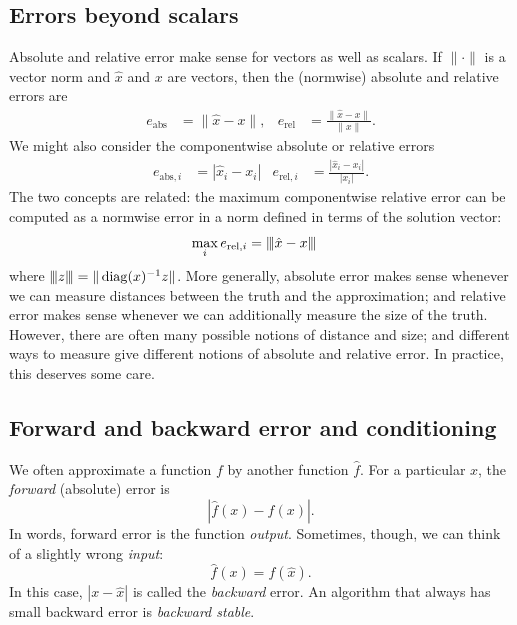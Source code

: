 \documentclass[12pt, leqno]{article}
\begin{document}
\subsection*{Errors beyond scalars}

Absolute and relative error make sense for vectors as well as scalars.
If $\| \cdot \|$ is a vector
norm and $\hat{x}$ and $x$ are vectors, then the (normwise) absolute
and relative errors are
\begin{align*}
  e_{\mathrm{abs}} &= \|\hat{x}-x\|, &
  e_{\mathrm{rel}} &= \frac{\|\hat{x}-x\|}{\|x\|}.
\end{align*}
We might also consider the componentwise absolute or relative errors
\begin{align*}
  e_{\mathrm{abs},i} &= |\hat{x}_i-x_i| &
  e_{\mathrm{rel},i} &= \frac{|\hat{x}_i-x_i|}{|x_i|}.
\end{align*}
The two concepts are related: the maximum componentwise relative error
can be computed as a normwise error in a norm defined in terms of the
solution vector:
\begin{align*}
  \max_i e_{\mathrm{rel},i} &= {\left\vert\kern-0.25ex\left\vert\kern-0.25ex\left\vert \hat{x}-x \right\vert\kern-0.25ex\right\vert\kern-0.25ex\right\vert}
\end{align*}
where ${\left\vert\kern-0.25ex\left\vert\kern-0.25ex\left\vert z \right\vert\kern-0.25ex\right\vert\kern-0.25ex\right\vert} = \|\operatorname{diag}(x)^{-1} z\|$.
More generally, absolute error makes sense whenever we can measure
distances between the truth and the approximation; and relative error
makes sense whenever we can additionally measure the size of the
truth.  However, there are often many possible notions of distance
and size; and different ways to measure give different notions of
absolute and relative error.  In practice, this deserves some care.

\subsection*{Forward and backward error and conditioning}

We often approximate a function $f$ by another function $\hat{f}$.
For a particular $x$, the {\em forward} (absolute) error is
\[
  |\hat{f}(x)-f(x)|.
\]
In words, forward error is the function {\em output}.  Sometimes,
though, we can think of a slightly wrong {\em input}:
\[
  \hat{f}(x) = f(\hat{x}).
\]
In this case, $|x-\hat{x}|$ is called the {\em backward} error.
An algorithm that always has small backward error is {\em backward stable}.
\end{document}
